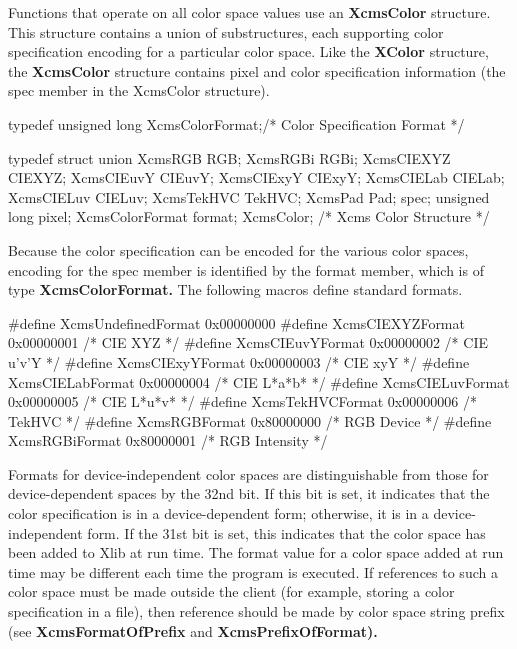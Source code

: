\documentclass{report}
\begin{document}
\begin{itemize}
            \bigbreak \noindent 
            Functions that operate on all color space values use an \textbf{XcmsColor} structure. This structure contains a union of substructures, each supporting color specification encoding for a particular color
            space. Like the \textbf{XColor} structure, the \textbf{XcmsColor} structure contains pixel and color specification information (the spec member in the XcmsColor structure).
            \bigbreak \noindent 
            \begin{cppcode}
                typedef unsigned long XcmsColorFormat;/* Color Specification Format */
            \end{cppcode}
            \bigbreak \noindent 
            \begin{cppcode}
                typedef struct {
                    union {
                        XcmsRGB RGB;
                        XcmsRGBi RGBi;
                        XcmsCIEXYZ CIEXYZ;
                        XcmsCIEuvY CIEuvY;
                        XcmsCIExyY CIExyY;
                        XcmsCIELab CIELab;
                        XcmsCIELuv CIELuv;
                        XcmsTekHVC TekHVC;
                        XcmsPad Pad;
                    } spec;
                    unsigned long pixel;
                    XcmsColorFormat format;
                } XcmsColor; /* Xcms Color Structure */
            \end{cppcode}
            \bigbreak \noindent 
            Because the color specification can be encoded for the various color spaces, encoding for the spec member is identified by the format member, which is of type \textbf{XcmsColorFormat.} The following macros define standard formats.
            \bigbreak \noindent 
            \begin{cppcode}
                #define XcmsUndefinedFormat 0x00000000
                #define XcmsCIEXYZFormat 0x00000001 /* CIE XYZ */
                #define XcmsCIEuvYFormat 0x00000002 /* CIE u’v’Y */
                #define XcmsCIExyYFormat 0x00000003 /* CIE xyY */
                #define XcmsCIELabFormat 0x00000004 /* CIE L*a*b* */
                #define XcmsCIELuvFormat 0x00000005 /* CIE L*u*v* */
                #define XcmsTekHVCFormat 0x00000006 /* TekHVC */
                #define XcmsRGBFormat 0x80000000 /* RGB Device */
                #define XcmsRGBiFormat 0x80000001 /* RGB Intensity */
            \end{cppcode}
            \bigbreak \noindent 
            Formats for device-independent color spaces are distinguishable from those for device-dependent spaces by the 32nd bit. If this bit is set, it indicates that the color specification is in a device-dependent form; otherwise, it is in a device-independent form. If the 31st bit is set, this indicates that the color space has been added to Xlib at run time. The format value for a color space added at run time may be different each time the program is executed. If references to such a color space must be made outside the client (for example, storing a color specification in a file), then reference should be made by color space string prefix (see \textbf{XcmsFormatOfPrefix} and \textbf{XcmsPrefixOfFormat).}

\end{itemize}
\end{document}

